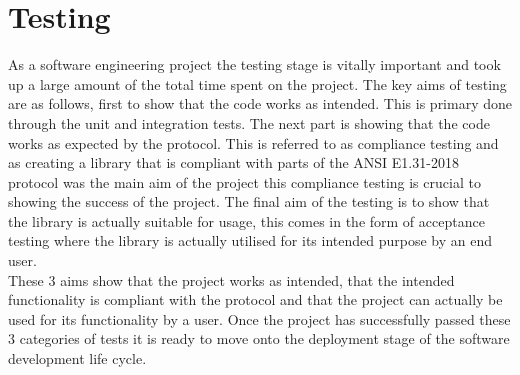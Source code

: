 \documentclass[11pt,a4paper]{report}
\begin{document}
\section{Testing}
As a software engineering project the testing stage is vitally important and took up a large amount of the total time spent on the project. The key aims of testing are as follows, first to show that the code works as intended. This is primary done through the unit and integration tests. The next part is showing that the code works as expected by the protocol. This is referred to as compliance testing and as creating a library that is compliant with parts of the ANSI E1.31-2018 protocol was the main aim of the project this compliance testing is crucial to showing the success of the project. The final aim of the testing is to show that the library is actually suitable for usage, this comes in the form of acceptance testing where the library is actually utilised for its intended purpose by an end user.\\

These 3 aims show that the project works as intended, that the intended functionality is compliant with the protocol and that the project can actually be used for its functionality by a user. Once the project has successfully passed these 3 categories of tests it is ready to move onto the deployment stage of the software development life cycle.
\end{document}

